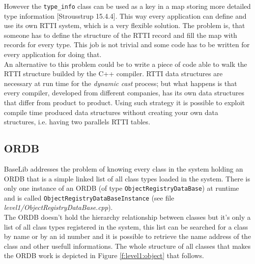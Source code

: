 However the \texttt{type\_info} class can be used as a key in a map storing more detailed type information [Strousstrup 15.4.4]. This way every application can define and use its own RTTI system, which is a very flexible solution. The problem is, that someone has to define the structure of the RTTI record and fill the map with records for every type. This job is not trivial and some code has to be written for every application for doing that. \\


An alternative to this problem could be to write a piece of code able to walk the RTTI structure builded by the C++ compiler. RTTI data structures are necessary at run time for the \textit{dynamic cast} process; but what happens is that every compiler, developed from different companies, has its own data structures that differ from product to product. Using such strategy it is possible to exploit compile time produced data structures without creating your own data structures, i.e. having two parallels RTTI tables. \\



\subsection{ORDB}
BaseLib addresses the problem of knowing every class in the system holding an ORDB that is a simple linked list of all class types loaded in the system. There is only one instance of an ORDB (of type \texttt{ObjectRegistryDataBase}) at runtime and is called \texttt{ObjectRegistryDataBaseInstance} (see file \textit{level1/ObjectRegistryDataBase.cpp}). \\


The ORDB doesn't hold the hierarchy relationship between classes but it's only a list of all class types registered in the system, this list can be searched for a class by name or by an id number and it is possible to retrieve the name address of the class and other usefull informations. The whole structure of all classes that makes the ORDB work is depicted in Figure \ref{f:level1:object} that follows.

